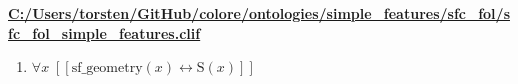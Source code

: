 \documentclass{article}
\begin{document}
\textbf{\url{C:/Users/torsten/GitHub/colore/ontologies/simple\_features/sfc\_fol/sfc\_fol\_simple\_features.clif}}

\begin{enumerate}
\item $\forall x\;  \left[ \left[ \textrm{sf\_geometry}(x) \leftrightarrow \textrm{S}(x) \right] \right]$
\end{enumerate}
\end{document}
